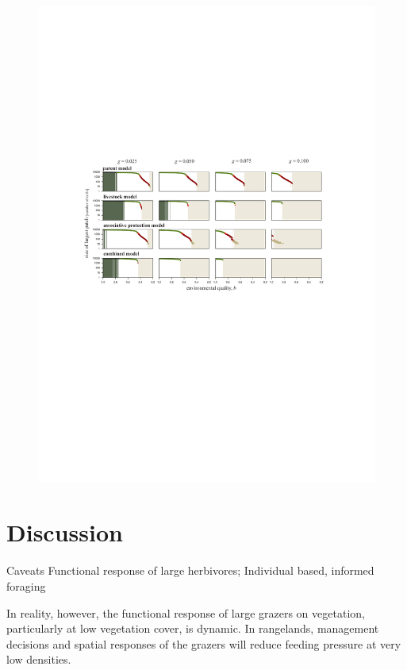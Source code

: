 \begin{figure}[tb]%
\includegraphics[width=\columnwidth]{figures/fig5.pdf}%
\caption{}%
\label{fig:fig5}%
\end{figure}



\section{Discussion}

Caveats
Functional response of large herbivores; Individual based, informed foraging


In reality, however, the functional response of large grazers on vegetation, particularly at low vegetation cover, is dynamic. In rangelands, management decisions and spatial responses of the grazers will reduce feeding pressure at very low densities. 

